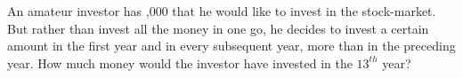 
%
%
%
%
% 

\question[4]  An amateur investor has ,000 that he would like to invest in the
stock-market. But rather than invest all the money in one go, he decides to invest 
a certain amount in the first year and in every subsequent year,  more than
in the preceding year. How much money would the investor have invested in the $13^{th}$ year?

\ifprintanswers
\fi 

